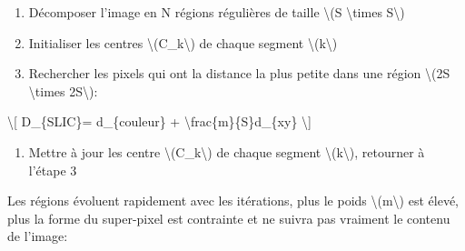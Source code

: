 \documentclass[
]{article}
\providecommand{\tightlist}{%
  \setlength{\itemsep}{0pt}\setlength{\parskip}{0pt}}
\begin{document}
\begin{enumerate}
\def\labelenumi{\arabic{enumi}.}
\item
  Décomposer l'image en N régions régulières de taille {\textbackslash(S
  \textbackslash times S\textbackslash)}
\item
  Initialiser les centres {\textbackslash(C\_k\textbackslash)} de chaque
  segment {\textbackslash(k\textbackslash)}
\item
  Rechercher les pixels qui ont la distance la plus petite dans une
  région {\textbackslash(2S \textbackslash times 2S\textbackslash)}:
\end{enumerate}

{\textbackslash{[} D\_\{SLIC\}= d\_\{couleur\} +
\textbackslash frac\{m\}\{S\}d\_\{xy\} \textbackslash{]}}

\begin{enumerate}
\def\labelenumi{\arabic{enumi}.}
\setcounter{enumi}{2}
\tightlist
\item
  Mettre à jour les centre {\textbackslash(C\_k\textbackslash)} de
  chaque segment {\textbackslash(k\textbackslash)}, retourner à l'étape
  3
\end{enumerate}

Les régions évoluent rapidement avec les itérations, plus le poids
{\textbackslash(m\textbackslash)} est élevé, plus la forme du
super-pixel est contrainte et ne suivra pas vraiment le contenu de
l'image:
\end{document}
